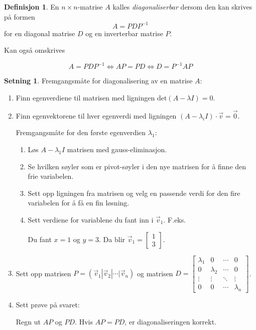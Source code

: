\documentclass[11pt]{article}
\theoremstyle{definition}
\newtheorem{mindef}{Definisjon}[section]
\newenvironment{fmindef}
{\begin{mdframed}[style=minstil]\begin{mindef}}
		{\end{mindef}\end{mdframed}}
\theoremstyle{definition}
\theoremstyle{definition}
\newtheorem{minset}{Setning}[section]
\newenvironment{fminset}
{\begin{mdframed}[style=minstil]\begin{minset}}
		{\end{minset}\end{mdframed}}
\theoremstyle{definition}
\theoremstyle{definition}
\theoremstyle{definition}
\begin{document}
		\begin{fmindef}
			En \(n\times n \)-matrise \(A\) kalles \textit{diagonaliserbar} dersom den kan skrives på formen \[A=PDP^{-1}\]
			for en diagonal matrise \(D\) og en inverterbar matrise \(P\).
			
			Kan også omskrives 
			
			\[A=PDP^{-1} \Longleftrightarrow AP=PD \Longleftrightarrow D=P^{-1}AP  \]
		\end{fmindef}
		
		\newpage
		
		\begin{fminset}
		Fremgangsmåte for diagonalisering av en matrise \(A\):
		\begin{enumerate}
			\item Finn egenverdiene til matrisen med ligningen \(\text{det}(A-\lambda I)=0\).
			\item Finn egenvektorene til hver egenverdi med ligningen \((A-\lambda_iI)\cdot \vec{v}=\vec{0} \). 
			
			Fremgangsmåte for den første egenverdien \(\lambda_1 \): 
			\begin{enumerate}
				\item Løs \(A-\lambda_1I\) matrisen med gauss-eliminasjon.
				\item Se hvilken søyler som er pivot-søyler i den nye matrisen for å finne den frie variabelen.
				\item Sett opp ligningen fra matrisen og velg en passende verdi for den fire variabelen for å få en fin løsning.
				\item Sett verdiene for variablene du fant inn i \(\vec{v}_1 \). F.eks. 
				
				Du fant \(x=1\) og \(y=3\). Da blir \(\vec{v}_1=\left[\begin{array}{rr} 
				1  \\
				3 
				\end{array} \right] \).
			\end{enumerate}
		\item Sett opp matrisen \(P=\left(\vec{v}_1|\vec{v}_2|\cdots|\vec{v}_n \right)\) og matrisen \(D=\left[\begin{array}{cccc} 
		\lambda_1 & 0 & \cdots & 0 \\
		0 & \lambda_2 & \cdots & 0 \\
		\vdots & \vdots & \ddots & \vdots \\
		0 & 0 & \cdots & \lambda_n
		\end{array} \right]\).
		\item Sett prøve på svaret:
		
		Regn ut \(AP\) og \(PD\). Hvis \(AP=PD\), er diagonaliseringen korrekt.
 		\end{enumerate}
		\end{fminset}
		
\end{document}
